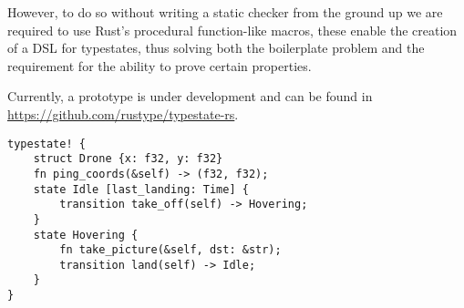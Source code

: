 \documentclass{article}
\begin{document}
However, to do so without writing a static checker from the ground up we are required to use Rust's procedural function-like macros,
these enable the creation of a DSL for typestates,
thus solving both the boilerplate problem and the requirement for the ability to prove certain properties.

Currently, a prototype is under development and can be found in \url{https://github.com/rustype/typestate-rs}.

\begin{verbatim}
typestate! {
    struct Drone {x: f32, y: f32}
    fn ping_coords(&self) -> (f32, f32);
    state Idle [last_landing: Time] {
        transition take_off(self) -> Hovering;
    }
    state Hovering {
        fn take_picture(&self, dst: &str);
        transition land(self) -> Idle;
    }
}
\end{verbatim}
\end{document}
